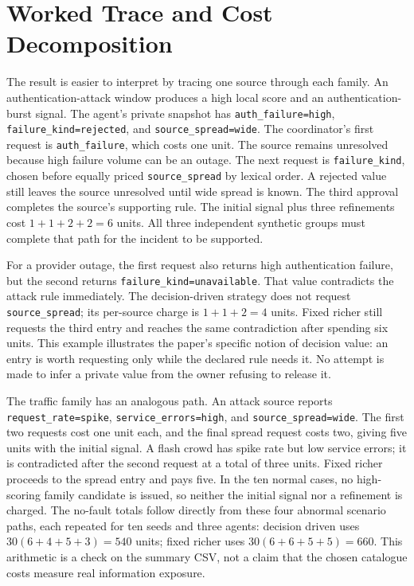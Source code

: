 \documentclass[conference,letterpaper]{IEEEtran}
\begin{document}
\section{Worked Trace and Cost Decomposition}
The result is easier to interpret by tracing one source through each family. An authentication-attack window produces a high local score and an authentication-burst signal. The agent's private snapshot has \texttt{auth\_failure=high}, \texttt{failure\_kind=rejected}, and \texttt{source\_spread=wide}. The coordinator's first request is \texttt{auth\_failure}, which costs one unit. The source remains unresolved because high failure volume can be an outage. The next request is \texttt{failure\_kind}, chosen before equally priced \texttt{source\_spread} by lexical order. A rejected value still leaves the source unresolved until wide spread is known. The third approval completes the source's supporting rule. The initial signal plus three refinements cost $1+1+2+2=6$ units. All three independent synthetic groups must complete that path for the incident to be supported.

For a provider outage, the first request also returns high authentication failure, but the second returns \texttt{failure\_kind=unavailable}. That value contradicts the attack rule immediately. The decision-driven strategy does not request \texttt{source\_spread}; its per-source charge is $1+1+2=4$ units. Fixed richer still requests the third entry and reaches the same contradiction after spending six units. This example illustrates the paper's specific notion of decision value: an entry is worth requesting only while the declared rule needs it. No attempt is made to infer a private value from the owner refusing to release it.

The traffic family has an analogous path. An attack source reports \texttt{request\_rate=spike}, \texttt{service\_errors=high}, and \texttt{source\_spread=wide}. The first two requests cost one unit each, and the final spread request costs two, giving five units with the initial signal. A flash crowd has spike rate but low service errors; it is contradicted after the second request at a total of three units. Fixed richer proceeds to the spread entry and pays five. In the ten normal cases, no high-scoring family candidate is issued, so neither the initial signal nor a refinement is charged. The no-fault totals follow directly from these four abnormal scenario paths, each repeated for ten seeds and three agents: decision driven uses $30(6+4+5+3)=540$ units; fixed richer uses $30(6+6+5+5)=660$. This arithmetic is a check on the summary CSV, not a claim that the chosen catalogue costs measure real information exposure.
\end{document}
